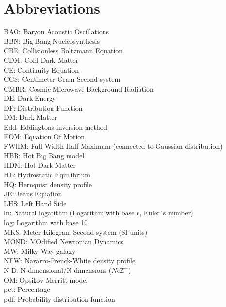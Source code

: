 \section{Abbreviations}
BAO:             Baryon Acoustic Oscillations \\
BBN:             Big Bang Nucleosynthesis \\
CBE: 			 Collisionless Boltzmann Equation \\
CDM: 	         Cold Dark Matter \\
CE:              Continuity Equation \\
CGS:             Centimeter-Gram-Second system \\
CMBR:            Cosmic Microwave Background Radiation \\
DE: 			     Dark Energy \\
DF: 		 	     Distribution Function \\
DM: 			     Dark Matter \\
Edd:             Eddingtons inversion method \\
EOM:             Equation Of Motion \\
FWHM:            Full Width Half Maximum (connected to Gaussian distribution) \\
HBB:             Hot Big Bang model \\
HDM: 		     Hot Dark Matter	\\
HE:  		     Hydrostatic Equilibrium  \\
HQ:              Hernquist density profile \\
JE:   		     Jeans Equation \\
LHS:             Left Hand Side \\
ln:              Natural logarithm (Logarithm with base e, Euler´s number) \\
log:             Logarithm with base 10 \\
MKS:             Meter-Kilogram-Second system (SI-units) \\
MOND:            MOdified Newtonian Dynamics \\
MW:              Milky Way galaxy \\
NFW:             Navarro-Frenck-White density profile \\
N-D:             N-dimensional/N-dimensions ($ N \epsilon \mathbb{Z}^+ $) \\
OM:              Opsikov-Merritt model \\
pct:             Percentage \\
pdf:             Probability distribution function \\
